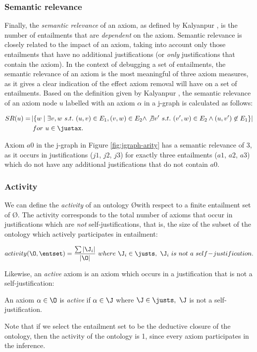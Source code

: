 \subsubsection{Semantic relevance}
Finally, the \emph{semantic relevance} of an axiom, as defined by Kalyanpur \cite{kalyanpur06nm},  is the number of entailments that are \emph{dependent} on the axiom. Semantic relevance is closely related to the impact of an axiom, taking into account only those entailments that have no additional justifications (or \emph{only} justifications that contain the axiom). In the context of debugging a set of entailments, the semantic relevance of an axiom is the most meaningful of three axiom measures, as it gives a clear indication of the effect axiom removal will have on a set of entailments. Based on the definition given by Kalyanpur \cite{kalyanpur06nm} , the semantic relevance of an axiom node $u$ labelled with an axiom $\alpha$ in a j-graph is calculated as follows: 
\begin{defn}
\begin{align*}
SR(u)  =  & \left| \{ w \mid \exists v, w ~ s.t. ~ (u, v) \in E_{1}, (v, w) \in E_{2} \wedge \not\exists v'   ~ s.t. ~ (v', w) \in E_{2} \wedge (u, v') \not\in E_{1} \}  \right|  \\
& ~ for ~ u \in \justax.
\end{align*}
\end{defn}

Axiom $a0$ in the j-graph in Figure \ref{fig:jgraph-arity} has a semantic relevance of 3, as it occurs in justifications ($j1$, $j2$, $j3$) for exactly three entailments ($a1$, $a2$, $a3$) which do not have any additional justifications that do not contain $a0$.

\subsubsection{Activity} 

We can define the \emph{activity} of an ontology \O with respect to a finite entailment set \entset  of \O. The activity corresponds to the total number of axioms that occur in justifications which are \emph{not} self-justifications, that is, the size of the subset of the ontology which actively participates in entailment: 
\begin{defn}[Activity]
\begin{align*}
activity(\O, \entset) = \dfrac{ \sum \left|\J_{i}\right| }{\left|\O\right|} ~ where~ \J_{i} \in \justs, ~ \J_{i} ~is ~not ~a ~self\!-\!justification.
\end{align*}
\end{defn}
Likewise, an \emph{active} axiom is an axiom which occurs in a justification that is not a self-justification:
\begin{defn}
An axiom $\alpha \in \O$ is \emph{active} if $\alpha \in \J$ where $\J \in \justs, ~ \J$ is not a self-justification.
\end{defn}
Note that if we select the entailment set to be the deductive closure of the ontology, then the activity of the ontology is 1, since every axiom participates in the inference.


